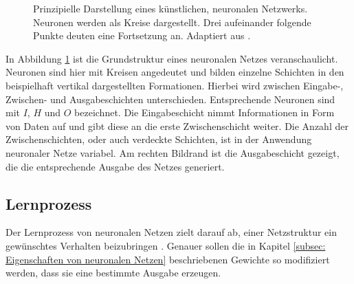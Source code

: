 \begin{figure}[H]
				\caption{Prinzipielle Darstellung eines künstlichen, neuronalen Netzwerks. Neuronen werden als Kreise dargestellt. Drei aufeinander folgende Punkte deuten eine Fortsetzung an. Adaptiert aus \cite{neuron}.}
				\label{fig: neuronales netz }
		\end{figure}
	
		
		In Abbildung \ref{fig: neuronales netz } ist die Grundstruktur eines neuronalen Netzes veranschaulicht. Neuronen sind hier mit Kreisen angedeutet und bilden einzelne Schichten in den beispielhaft vertikal dargestellten Formationen. Hierbei wird zwischen Eingabe-, Zwischen- und Ausgabeschichten unterschieden. Entsprechende Neuronen sind mit $I$, $H$ und $O$ bezeichnet. Die Eingabeschicht nimmt Informationen in Form von Daten auf und gibt diese an die erste Zwischenschicht weiter. Die Anzahl der Zwischenschichten, oder auch verdeckte Schichten, ist in der Anwendung neuronaler Netze variabel. Am rechten Bildrand ist die Ausgabeschicht gezeigt, die die entsprechende Ausgabe des Netzes generiert.  
	
		\subsection{Lernprozess}
		Der Lernprozess von neuronalen Netzen zielt darauf ab, einer Netzstruktur ein gewünschtes Verhalten beizubringen \cite{proba}. Genauer sollen die in Kapitel \ref{subsec: Eigenschaften von neuronalen Netzen} beschriebenen Gewichte so modifiziert werden, dass sie eine bestimmte Ausgabe erzeugen.\\
		
